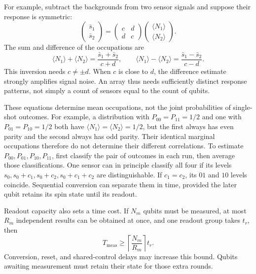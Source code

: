For example, subtract the backgrounds from two sensor
signals and suppose their response is symmetric:
\[
 \begin{pmatrix}\bar s_1\\\bar s_2\end{pmatrix}
 =\begin{pmatrix}c&d\\d&c\end{pmatrix}
   \begin{pmatrix}\langle N_1\rangle\\\langle N_2\rangle\end{pmatrix}.
\]
The sum and difference of the occupations are
\begin{equation}
 \langle N_1\rangle+\langle N_2\rangle
       =\frac{\bar s_1+\bar s_2}{c+d},\qquad
 \langle N_1\rangle-\langle N_2\rangle
       =\frac{\bar s_1-\bar s_2}{c-d}.
 \label{eq:processor-sensor-inversion}
\end{equation}
This inversion needs \(c\ne\pm d\). When \(c\) is close to
\(d\), the difference estimate strongly amplifies signal
noise. An array thus needs sufficiently distinct response
patterns, not simply a count of sensors equal to the count
of qubits.

These equations determine mean occupations, not the joint
probabilities of single-shot outcomes. For example, a distribution
with \(P_{00}=P_{11}=1/2\) and one with
\(P_{01}=P_{10}=1/2\) both have
\(\langle N_1\rangle=\langle N_2\rangle=1/2\), but the first
always has even parity and the second always has odd parity.
Their identical marginal occupations therefore do not determine
their different correlations. To estimate
\(P_{00},P_{01},P_{10},P_{11}\), first
classify the pair of outcomes in each run, then average those
classifications. One sensor can in principle classify all
four if its levels \(s_0,s_0+c_1,s_0+c_2,s_0+c_1+c_2\)
are distinguishable. If \(c_1=c_2\), its \(01\) and \(10\)
levels coincide. Sequential conversion can separate them
in time, provided the later qubit retains its spin state
until its readout.

Readout capacity also sets a time cost. If \(N_m\) qubits
must be measured, at most \(R_m\) independent results can be
obtained at once, and one readout group takes \(t_r\), then
\[
 T_{\mathrm{meas}}\ge
 \left\lceil\frac{N_m}{R_m}\right\rceil t_r.
\]
Conversion, reset, and shared-control delays may increase
this bound. Qubits awaiting measurement must retain their
state for those extra rounds.

